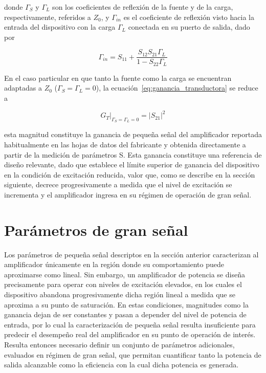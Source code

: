 donde $\Gamma_S$ y $\Gamma_L$ son los coeficientes de reflexión de la fuente y de la carga, respectivamente, referidos a $Z_0$, y $\Gamma_{in}$ es el coeficiente de reflexión visto hacia la entrada del dispositivo con la carga $\Gamma_L$ conectada en su puerto de salida, dado por \cite[p.~560]{pozar2011}

\begin{equation}
    \Gamma_{in} = S_{11} + \frac{S_{12}S_{21}\Gamma_L}{1-S_{22}\Gamma_L}
    \label{eq:gamma_in}
\end{equation}

En el caso particular en que tanto la fuente como la carga se encuentran adaptadas a $Z_0$ ($\Gamma_S = \Gamma_L = 0$), la ecuación~\eqref{eq:ganancia_transductora} se reduce a

\begin{equation}
    G_T\big|_{\Gamma_S=\Gamma_L=0} = |S_{21}|^2
    \label{eq:ganancia_s21}
\end{equation}

esta magnitud constituye la ganancia de pequeña señal del amplificador reportada habitualmente en las hojas de datos del fabricante y obtenida directamente a partir de la medición de parámetros S. Esta ganancia constituye una referencia de diseño relevante, dado que establece el límite superior de ganancia del dispositivo en la condición de excitación reducida, valor que, como se describe en la sección siguiente, decrece progresivamente a medida que el nivel de excitación se incrementa y el amplificador ingresa en su régimen de operación de gran señal.

\section{Parámetros de gran señal}
Los parámetros de pequeña señal descriptos en la sección anterior caracterizan al amplificador únicamente en la región donde su comportamiento puede aproximarse como lineal. Sin embargo, un amplificador de potencia se diseña precisamente para operar con niveles de excitación elevados, en los cuales el dispositivo abandona progresivamente dicha región lineal a medida que se aproxima a su punto de saturación. En estas condiciones, magnitudes como la ganancia dejan de ser constantes y pasan a depender del nivel de potencia de entrada, por lo cual la caracterización de pequeña señal resulta insuficiente para predecir el desempeño real del amplificador en su punto de operación de interés. Resulta entonces necesario definir un conjunto de parámetros adicionales, evaluados en régimen de gran señal, que permitan cuantificar tanto la potencia de salida alcanzable como la eficiencia con la cual dicha potencia es generada.

